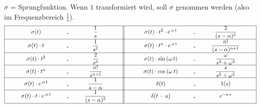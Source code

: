 $\sigma$ = Sprungfunktion. Wenn $1$ transformiert wird, soll $\sigma$ genommen werden (also im Frequenzbereich $\frac{1}{s}$).
\let\DS=\displaystyle
\renewcommand{\arraystretch}{2.5}
{ \[
\begin{array}{|@{\hspace{1cm}}c@{\hspace{1cm}}c@{\hspace{1cm}}c@{\hspace{1cm}}||c@{\hspace{1cm}}c@{\hspace{1cm}}c@{\hspace{1cm}}c@{\hspace{1cm}}|}
\hline
\sigma(t) & \FT & \DS\frac{1}{s} &&\sigma(t)\cdot t^2\cdot e^{\,\alpha\,t} & \FT & \DS\frac{2}{(s-\alpha)^3} \\
\hline
\sigma(t)\cdot t & \FT & \DS\frac{1}{s^2} &&\sigma(t)\cdot t^n\cdot e^{\,\alpha\,t} & \FT & \DS\frac{n!}{(s-\alpha)^{n+1}} \\
\hline
\sigma(t)\cdot t^2 & \FT & \DS\frac{2}{s^3} &&\sigma(t)\cdot\sin\,(\omega\,t) & \FT & \DS\frac{\omega}{s^2+\omega^2} \\
\hline
\sigma(t)\cdot t^n & \FT & \DS\frac{n!}{s^{n+1}} &&\sigma(t)\cdot\cos\,(\omega\,t) & \FT & \DS\frac{s}{s^2+\omega^2} \\
\hline
\sigma(t)\cdot e^{\,\alpha\,t} & \FT & \DS\frac{1}{s-\alpha} &&\delta(t) & \FT & 1(s) \\
\hline
\sigma(t)\cdot t\cdot e^{\,\alpha\,t} & \FT & \DS\frac{1}{(s-\alpha)^2} &&\delta(t-a) & \FT & e^{-a\,s} \\
\hline
\end{array} \] }
